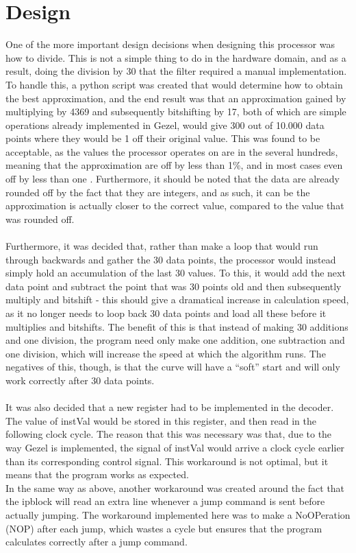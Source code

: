 \documentclass[12pt,a4paper]{article}
\begin{document}
\section{Design}
One of the more important design decisions when designing this processor was how to divide. This is not a simple thing to do in the hardware domain, and as a result, doing the division by 30 that the filter required a manual implementation. To handle this, a python script was created that would determine how to obtain the best approximation, and the end result was that an approximation gained by multiplying by 4369 and subsequently bitshifting by 17, both of which are simple operations already implemented in Gezel, would give 300 out of 10.000 data points where they would be 1 off their original value. This was found to be acceptable, as the values the processor operates on are in the several hundreds, meaning that the approximation are off by less than 1\%, and in most cases even off by less than one \textperthousand. Furthermore, it should be noted that the data are already rounded off by the fact that they are integers, and as such, it can be the approximation is actually closer to the correct value, compared to the value that was rounded off.\\
\\
Furthermore, it was decided that, rather than make a loop that would run through backwards and gather the 30 data points, the processor would instead simply hold an accumulation of the last 30 values. To this, it would add the next data point and subtract the point that was 30 points old and then subsequently multiply and bitshift - this should give a dramatical increase in calculation speed, as it no longer needs to loop back 30 data points and load all these before it multiplies and bitshifts. The benefit of this is that instead of making 30 additions and one division, the program need only make one addition, one subtraction and one division, which will increase the speed at which the algorithm runs. The negatives of this, though, is that the curve will have a ``soft'' start and will only work correctly after 30 data points.\\
\\
It was also decided that a new register had to be implemented in the decoder. The value of instVal would be stored in this register, and then read in the following clock cycle. The reason that this was necessary was that, due to the way Gezel is implemented, the signal of instVal would arrive a clock cycle earlier than its corresponding control signal. This workaround is not optimal, but it means that the program works as expected.\\
In the same way as above, another workaround was created around the fact that the ipblock will read an extra line whenever a jump command is sent before actually jumping. The workaround implemented here was to make a NoOPeration (NOP) after each jump, which wastes a cycle but ensures that the program calculates correctly after a jump command.\\
\\
\end{document}
